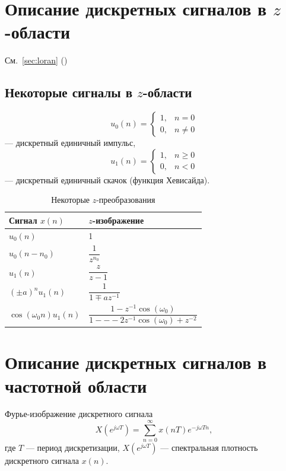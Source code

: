 \documentclass[a4paper, 14pt]{extarticle}
\begin{document}
\section{Описание дискретных сигналов в $z$-области}
См.~\ref{sec:loran} ()

\subsection{Некоторые сигналы в $z$-области}
\begin{equation}
    u_0(n) = \begin{cases}
        1, &n=0\\
        0, &n\ne 0
    \end{cases}
\end{equation}
--- дискретный единичный импульс,
\begin{equation}
    u_1(n) = \begin{cases}
        1, &n \ge 0\\
        0, &n < 0
    \end{cases}
\end{equation}
--- дискретный единичный скачок (функция Хевисайда).
\begin{table}[h]
    \centering
    \caption{Некоторые $z$-преобразования}
    \begin{tabular}{@{}ll@{}}
        \toprule
        \textbf{Сигнал $x(n)$} & $z$-изображение \\ \midrule
        $u_0(n)$ & 1 \\[6pt]
        $u_0(n-n_0)$ & $ \dfrac{1}{z^{n_0}} $ \\[12pt]
        $u_1(n)$ & $ \dfrac{z}{z-1} $ \\[12pt]
        ${(\pm a)}^n u_1(n)$ & $ \dfrac{1}{1 \mp az^{-1}} $ \\[12pt]
        $\cos( \omega_0 n ) u_1(n)$ & $ \dfrac{1 - z^{-1} \cos( \omega_0 )}{1 ---  2z^{-1} \cos( \omega_0 ) + z^{-2}} $ \\ \bottomrule
    \end{tabular}
\end{table}

\section{Описание дискретных сигналов в частотной области}
Фурье-изображение дискретного сигнала
\begin{equation}
    X(e^{j \omega T}) = \sum^{\infty}_{n=0} x(nT)e^{-j \omega Tn},
\end{equation}
где $T$ --- период дискретизации, $X(e^{j \omega T})$ --- спектральная плотность дискретного сигнала $x(n)$.
\end{document}
